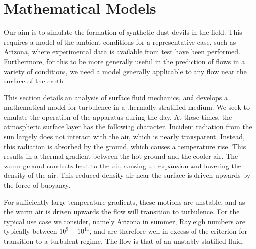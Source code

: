 \section{Mathematical Models}
\label{sec:mathmodel}


%
%

Our aim is to simulate the formation of synthetic dust devils in the
field. This requires a model of the ambient conditions for a
representative case, such as Arizona, where experimental data is
available from test have been performed. Furthermore, for this to be
more generally useful in the prediction of flows in a variety of
conditions, we need a model generally applicable to any flow near the
surface of the earth.  

This section details an analysis of surface fluid mechanics, and
develops a mathematical model for turbulence in a thermally stratified
medium. We seek to emulate the operation of the apparatus during the day. 
At these times, the atmospheric surface layer has the following character. 
Incident radiation from the sun largely does not interact with the
air, which is nearly transparent. Instead, this radiation is absorbed by
the ground, which causes a temperature rise. This results in a thermal
gradient between the hot ground and the cooler air. The warm ground
conducts heat to the air, causing an expansion and lowering the density
of the air. This reduced density air near the surface is driven upwards
by the force of buoyancy.  

For sufficiently large temperature gradients, these motions are
unstable, and as the warm air is driven upwards the flow will transition
to turbulence. For the typical use case we consider, namely Arizona in summer, 
Rayleigh numbers are typically between $10^{9} - 10^{11}$, and are therefore 
well in excess of the criterion for transition to a turbulent regime. The 
flow is that of an unstably statified fluid. 

